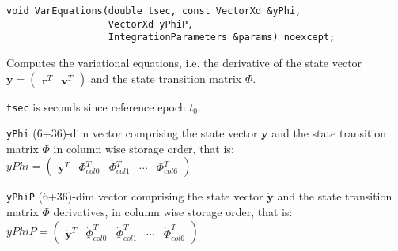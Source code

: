 \begin{lstlisting}
void VarEquations(double tsec, const VectorXd &yPhi,
                  VectorXd yPhiP,
                  IntegrationParameters &params) noexcept;
\end{lstlisting}

Computes the variational equations, i.e. the derivative of the state vector 
$\bm{y} = \begin{pmatrix}\bm{r}^T & \bm{v}^T \end{pmatrix}$ and the state 
transition matrix $\Phi$.

\texttt{tsec} is seconds since reference epoch $t_0$.

\texttt{yPhi} (6+36)-dim vector comprising the state vector $\bm{y}$ and the
state transition matrix $\Phi$ in column wise storage order, that is:
$yPhi = \begin{pmatrix}
    \bm{y}^T &  \Phi ^T _{col0} & \Phi ^T _{col1} & \cdots & \Phi^T _{col6}
\end{pmatrix}$

\texttt{yPhiP} (6+36)-dim vector comprising the state vector 
$\dot{\bm{y}}$ and the state transition matrix $\dot{\Phi}$ derivatives, in 
column wise storage order, that is:
$yPhiP = \begin{pmatrix}
    \dot{\bm{y}}^T &  \dot{\Phi} ^T _{col0} & \dot{\Phi} ^T _{col1} & \cdots & \dot{\Phi} ^T _{col6}
\end{pmatrix}$

